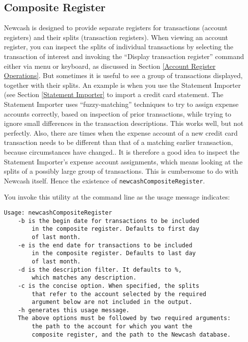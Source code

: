 \documentclass{report}
\begin{document}
\subsection{Composite Register}
\label{Composite Register}
Newcash is designed to provide separate registers for transactions (account registers) and their splits (transaction registers). When viewing an account register, you can inspect the splits of individual transactions by selecting the transaction of interest and invoking the ``Display transaction register'' command either via menu or keyboard, as discussed in Section \ref{Account Register Operations}. But sometimes it is useful to see a group of transactions displayed, together with their splits. An example is when you use the Statement Importer (see Section \ref{Statement Importer} to import a credit card statement. The Statement Importer uses ``fuzzy-matching'' techniques to try to assign expense accounts correctly, based on inspection of prior transactions, while trying to ignore small differences in the transaction descriptions. This works well, but not perfectly. Also, there are times when the expense account of a new credit card transaction needs to be different than that of a matching earlier transaction, because circumstances have changed.. It is therefore a good idea to inspect the Statement Importer's expense account assignments, which  means looking at the splits of a possibly large group of transactions. This is cumbersome to do with Newcash itself. Hence the existence of \verb|newcashCompositeRegister|.

You invoke this utility at the command line as the usage message indicates:
\begin{verbatim}
Usage: newcashCompositeRegister
	-b is the begin date for transactions to be included
        in the composite register. Defaults to first day
        of last month.
	-e is the end date for transactions to be included
        in the composite register. Defaults to last day
        of last month.
    -d is the description filter. It defaults to %,
        which matches any description.
    -c is the concise option. When specified, the splits
        that refer to the account selected by the required
        argument below are not included in the output.
	-h generates this usage message.
    The above options must be followed by two required arguments:
        the path to the account for which you want the
        composite register, and the path to the Newcash database.
\end{verbatim}
\end{document}
